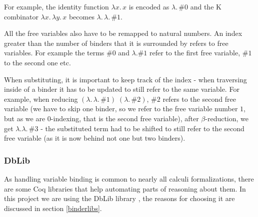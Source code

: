 \documentclass[runningheads]{article}
\begin{document}
For example, the identity function $\lambda x. \, x$ is encoded as $\lambda. \, \#0$ and the K combinator $\lambda x. \, \lambda y. \, x$ becomes $\lambda. \, \lambda. \, \#1$.

All the free variables also have to be remapped to natural numbers. An index greater than the number of binders that it is surrounded by refers to free variables. For example the terms $\#0$ and $\lambda. \#1$ refer to the first free variable, $\#1$ to the second one etc.

When substituting, it is important to keep track of the index - when traversing inside of a binder it has to be updated to still refer to the same variable.
For example, when reducing $(\lambda. \, \lambda. \, \#1) \; (\lambda. \, \#2)$, $\#2$ refers to the second free variable (we have to skip one binder, so we refer to the free variable number $1$, but as we are $0$-indexing, that is the second free variable), after $\beta$-reduction, we get $\lambda. \lambda. \, \#3$ - the substituted term had to be shifted to still refer to the second free variable (as it is now behind not one but two binders).

\subsubsection{DbLib}

As handling variable binding is common to nearly all calculi formalizations, there are some Coq libraries that help automating parts of reasoning about them. In this project we are using the DbLib library \cite{dblib}, the reasons for choosing it are discussed in section \ref{binderlibs}.
\end{document}
